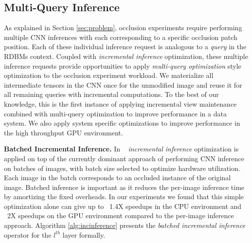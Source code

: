 \subsection{Multi-Query Inference}
As explained in Section \ref{sec:problem}, occlusion experiments require performing multiple CNN inferences with each corresponding to a specific occlusion patch position.
Each of these individual inference request is analogous to a \textit{query} in the RDBMs context.
Coupled with \textit{incremental inference} optimization, these multiple inference requests provide opportunities to apply \textit{multi-query optimization} style optimization to the occlusion experiment workload.
We materialize all intermediate tensors in the CNN once for the unmodified image and reuse it for all remaining queries with incremental computations.
To the best of our knowledge, this is the first instance of applying incremental view maintenance combined with multi-query optimization to improve performance in a data system.
We also apply system specific optimizations to improve performance in the high throughput GPU environment.

\vspace{2mm}
\noindent \textbf{Batched Incremental Inference.} In \system~ \textit{incremental inference} optimization is applied on top of the currently dominant approach of performing CNN inference on batches of images, with batch size selected to optimize hardware utilization.
Each image in the batch corresponds to an occluded instance of the original image.
Batched inference is important as it reduces the per-image inference time by amortizing the fixed overheads.
In our experiments we found that this simple optimization alone can give up to ~1.4X speedups in the CPU environment and ~2X speedups on the GPU environment compared to the per-image inference approach.
Algorithm \ref{alg:incinference} presents the \textit{batched incremental inference} operator for the $l^{th}$ layer formally.

